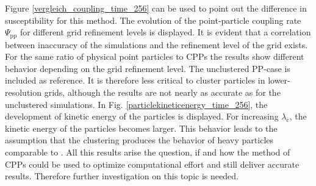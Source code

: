 \documentclass[11pt,a4paper,openany,oneside,parskip=half*]{article}
\begin{document}
Figure \ref{vergleich_coupling_time_256} can be used to point out the difference in susceptibility for this method. The evolution of the point-particle coupling rate $\Psi_\mathrm{pp}$ for different grid refinement levels is displayed. It is evident that a correlation between inaccuracy of the simulations and the refinement level of the grid exists. For the same ratio of physical point particles to CPPs the results show different behavior depending on the grid refinement level. The unclustered PP-case is included as reference. It is therefore less critical to cluster particles in lower-resolution grids, although the results are not nearly as accurate as for the unclustered simulations. 
\newline %
In Fig. \ref{particlekineticenergy_time_256}, the development of kinetic energy of the particles is displayed. For increasing $\lambda_\mathrm{c}$, the kinetic energy of the particles becomes larger. This behavior leads to the assumption that the clustering produces the behavior of heavy particles comparable to \cite{Schneiders2017}. 
\newline
All this results arise the question, if and how the method of CPPs could be used to optimize computational effort and still deliver accurate results. Therefore further investigation on this topic is needed. 
\pagebreak
\end{document}
